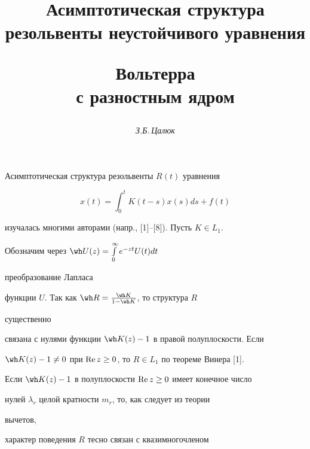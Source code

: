 \author{\it З.Б.\,Цалюк} 




\title{Асимптотическая структура резольвенты неустойчивого уравнения  


Вольтерра\\ с разностным ядром} 


 


\date{} 




\pagestyle{plain} %


 




\maketitle 


\label{begin} 


 


Асимптотическая структура резольвенты $R(t)$ уравнения 


\begin{equation} 


x(t)=\int^t_0 K(t-s)x(s)ds+f(t) 


\end{equation} 


изучалась многими авторами (напр., [1]--[8]). Пусть $K\in L_1$. 


Обозначим через $\wh U(z)=\int\limits^\infty_0 e^{-zt}U(t)dt$ 


преобразование Лапласа 


функции $U$. Так как $\wh R=\frac{\wh K}{1-\wh K}$, то структура $R$ 


существенно 


связана с нулями функции $\wh K(z)-1$ в правой полуплоскости. Если 


$\wh K(z)-1\ne0$ при $\operatorname{Re} z\ge0$, то $R\in L_1$ по теореме Винера [1]. 


Если $\wh K(z)-1$ в полуплоскости $\operatorname{Re} z\ge0$ имеет конечное число 


нулей $\lambda_r$ целой кратности $m_r$, то, как следует из теории 


вычетов, 


характер поведения $R$ тесно связан с квазимногочленом 


